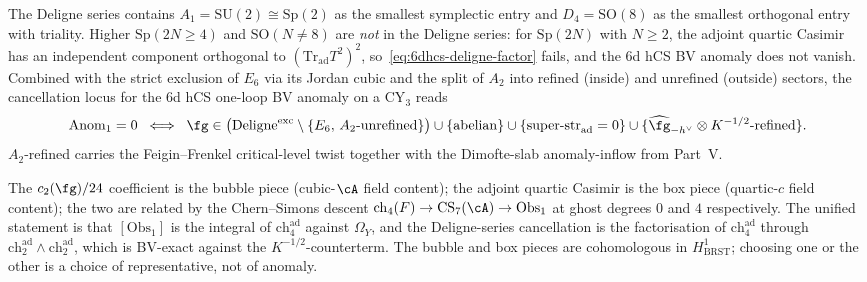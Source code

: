 \begin{remark}
\label{rem:6dhcs-sp-so}
The Deligne series contains $A_1=\mathrm{SU}(2)\cong\mathrm{Sp}(2)$
as the smallest symplectic entry and $D_4=\mathrm{SO}(8)$ as the
smallest orthogonal entry with triality. Higher
$\mathrm{Sp}(2N\geq 4)$ and $\mathrm{SO}(N\neq 8)$ are \emph{not}
in the Deligne series: for $\mathrm{Sp}(2N)$ with $N\geq 2$, the
adjoint quartic Casimir has an independent component orthogonal to
$(\mathrm{Tr}_{\mathrm{ad}}T^2)^2$,
so~\eqref{eq:6dhcs-deligne-factor} fails, and the 6d hCS BV
anomaly does not vanish. Combined with the strict exclusion of
$E_6$ via its Jordan cubic and the split of $A_2$ into refined
(inside) and unrefined (outside) sectors, the cancellation locus
for the 6d hCS one-loop BV anomaly on a CY$_3$ reads
\begin{equation}\label{eq:6dhcs-canonical-anom-locus}
\mathrm{Anom}_1=0\;\iff\;\fg\in
\bigl(\mathrm{Deligne}^{\mathrm{exc}}\setminus
\{E_6,\,A_2\text{-unrefined}\}\bigr)
\cup\{\mathrm{abelian}\}
\cup\{\mathrm{super\text{-}str}_{\mathrm{ad}}=0\}
\cup\{\widehat\fg_{-h^\vee}\otimes K^{-1/2}\text{-refined}\}.
\end{equation}
$A_2$-refined carries the Feigin--Frenkel critical-level twist
together with the Dimofte-slab anomaly-inflow from Part~V.
\end{remark}

\begin{remark}
\label{rem:6dhcs-descent}
The $c_2(\fg)/24$ coefficient is the bubble piece (cubic-$\cA$
field content); the adjoint quartic Casimir is the box piece
(quartic-$c$ field content); the two are related by the
Chern--Simons descent $\mathrm{ch}_4(F)\to\mathrm{CS}_7(\cA)\to
\mathrm{Obs}_1$ at ghost degrees $0$ and $4$ respectively. The
unified statement is that $[\mathrm{Obs}_1]$ is the integral of
$\mathrm{ch}_4^{\mathrm{ad}}$ against $\Omega_Y$, and the
Deligne-series cancellation is the factorisation of
$\mathrm{ch}_4^{\mathrm{ad}}$ through
$\mathrm{ch}_2^{\mathrm{ad}}\wedge\mathrm{ch}_2^{\mathrm{ad}}$,
which is BV-exact against the $K^{-1/2}$-counterterm. The bubble
and box pieces are cohomologous in $H^1_{\mathrm{BRST}}$; choosing
one or the other is a choice of representative, not of anomaly.
\end{remark}

